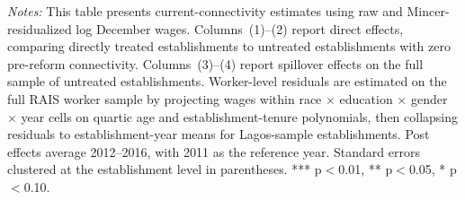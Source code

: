 \documentclass[11pt]{article}
\begin{document}
\begin{table}[H]
\begin{minipage}{\linewidth}
\textit{Notes:} This table presents current-connectivity estimates using raw and Mincer-residualized log December wages. Columns~(1)--(2) report direct effects, comparing directly treated establishments to untreated establishments with zero pre-reform connectivity. Columns~(3)--(4) report spillover effects on the full sample of untreated establishments. Worker-level residuals are estimated on the full RAIS worker sample by projecting wages within race $\times$ education $\times$ gender $\times$ year cells on quartic age and establishment-tenure polynomials, then collapsing residuals to establishment-year means for Lagos-sample establishments. Post effects average 2012--2016, with 2011 as the reference year. Standard errors clustered at the establishment level in parentheses. *** p$<$0.01, ** p$<$0.05, * p$<$0.10.
\end{minipage}
\end{table}
\end{document}
